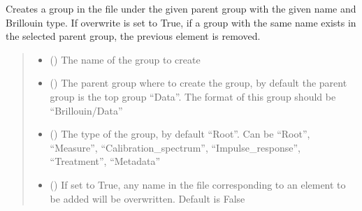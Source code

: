 \documentclass[letterpaper,10pt,english]{sphinxmanual}
\begin{document}
\begin{fulllineitems}
\begin{fulllineitems}
\label{\detokenize{_autosummary/HDF5_BLS.wrapper:HDF5_BLS.wrapper.Wrapper.create_group}}
\pysigstartsignatures
\pysiglinewithargsret
{}
{\sphinxparamcomma {}\sphinxparamcomma {}\sphinxparamcomma {}}
{}
\pysigstopsignatures
\sphinxAtStartPar
Creates a group in the file under the given parent group with the given name and Brillouin type. If overwrite is set to True, if a group with the same name exists in the selected parent group, the previous element is removed.
\begin{quote}\begin{description}
\begin{itemize}
\item {} 
\sphinxAtStartPar
{} () \textendash{} The name of the group to create

\item {} 
\sphinxAtStartPar
{} (\sphinxstyleliteralemphasis{\sphinxupquote{, }}) \textendash{} The parent group where to create the group, by default the parent group is the top group “Data”. The format of this group should be “Brillouin/Data”

\item {} 
\sphinxAtStartPar
{} (\sphinxstyleliteralemphasis{\sphinxupquote{, }}) \textendash{} The type of the group, by default “Root”. Can be “Root”, “Measure”, “Calibration\_spectrum”, “Impulse\_response”, “Treatment”, “Metadata”

\item {} 
\sphinxAtStartPar
{} (\sphinxstyleliteralemphasis{\sphinxupquote{, }}) \textendash{} If set to True, any name in the file corresponding to an element to be added will be overwritten. Default is False


\end{itemize}
\end{description}
\end{quote}
\end{fulllineitems}
\end{fulllineitems}
\end{document}
